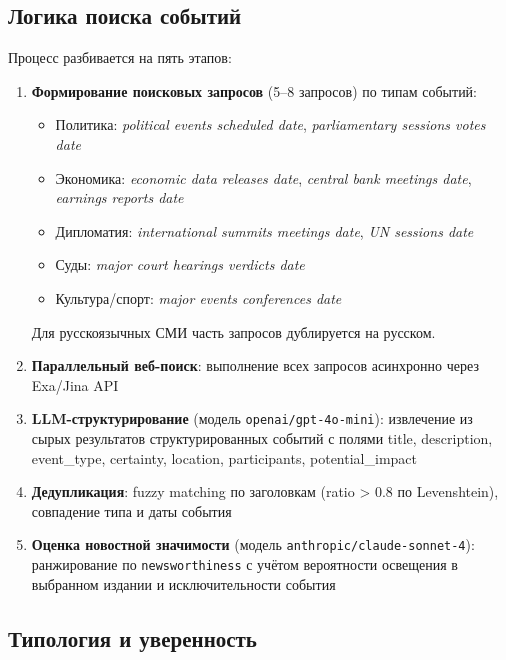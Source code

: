 
\subsection{Логика поиска событий}

Процесс разбивается на пять этапов:

\begin{enumerate}
    \item \textbf{Формирование поисковых запросов} (5--8 запросов) по типам событий:
    \begin{itemize}
        \item Политика: \emph{political events scheduled {date}}, \emph{parliamentary sessions votes {date}}
        \item Экономика: \emph{economic data releases {date}}, \emph{central bank meetings {date}}, \emph{earnings reports {date}}
        \item Дипломатия: \emph{international summits meetings {date}}, \emph{UN sessions {date}}
        \item Суды: \emph{major court hearings verdicts {date}}
        \item Культура/спорт: \emph{major events conferences {date}}
    \end{itemize}
    Для русскоязычных СМИ часть запросов дублируется на русском.

    \item \textbf{Параллельный веб-поиск}: выполнение всех запросов асинхронно через Exa/Jina API

    \item \textbf{LLM-структурирование} (модель \texttt{openai/gpt-4o-mini}): извлечение из сырых результатов структурированных событий с полями title, description, event\_type, certainty, location, participants, potential\_impact

    \item \textbf{Дедупликация}: fuzzy matching по заголовкам (ratio > 0.8 по Levenshtein), совпадение типа и даты события

    \item \textbf{Оценка новостной значимости} (модель \texttt{anthropic/claude-sonnet-4}): ранжирование по \texttt{newsworthiness} с учётом вероятности освещения в выбранном издании и исключительности события
\end{enumerate}


\subsection{Типология и уверенность}

